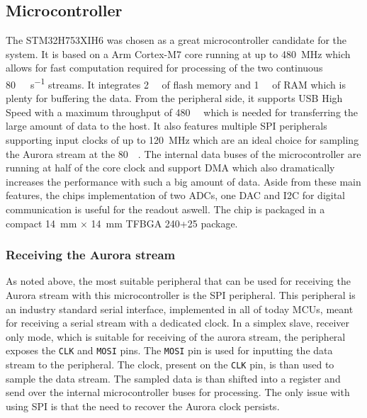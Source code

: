 \documentclass{cernatsnote}
\begin{document}
\subsection{Microcontroller}
The STM32H753XIH6 was chosen as a great microcontroller candidate for the system. It is based on a Arm Cortex-M7 core running at up to \SI{480}{\mega\hertz} which allows for fast computation required for processing of the two continuous \SI{80}{\mega\bit\per\second} streams. It integrates \SI{2}{\mega\byte} of flash memory and \SI{1}{\mega\byte} of RAM which is plenty for buffering the data. From the peripheral side, it supports USB High Speed with a maximum throughput of \SI{480}{\mega\bit} which is needed for transferring the large amount of data to the host. It also features multiple SPI peripherals supporting input clocks of up to \SI{120}{\mega\hertz} which are an ideal choice for sampling the Aurora stream at the \SI{80}{\mega\bit}. The internal data buses of the microcontroller are running at half of the core clock and support DMA which also dramatically increases the performance with such a big amount of data. Aside from these main features, the chips implementation of two ADCs, one DAC and I2C for digital communication is useful for the readout aswell. The chip is packaged in a compact \SI{14}{\milli\meter} $\times$ \SI{14}{\milli\meter} TFBGA 240+25 package.

\subsubsection{Receiving the Aurora stream}
As noted above, the most suitable peripheral that can be used for receiving the Aurora stream with this microcontroller is the SPI peripheral. This peripheral is an industry standard serial interface, implemented in all of today MCUs, meant for receiving a serial stream with a dedicated clock. In a simplex slave, receiver only mode, which is suitable for receiving of the aurora stream, the peripheral exposes the \verb|CLK| and \verb|MOSI| pins. The \verb|MOSI| pin is used for inputting the data stream to the peripheral. The clock, present on the \verb|CLK| pin, is than used to sample the data stream. The sampled data is than shifted into a register and send over the internal microcontroller buses for processing. The only issue with using SPI is that the need to recover the Aurora clock persists.
\end{document}
